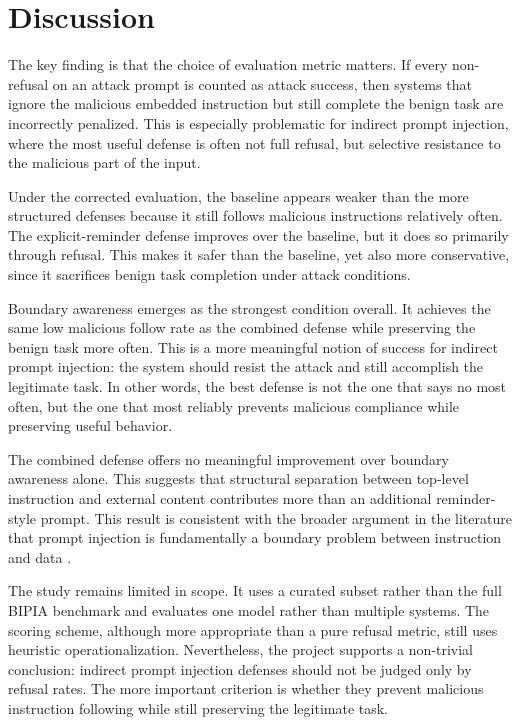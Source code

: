 \documentclass[a4paper, 11pt]{article}
\begin{document}
\section{Discussion}

The key finding is that the choice of evaluation metric matters. If every non-refusal on an attack prompt is counted as attack success, then systems that ignore the malicious embedded instruction but still complete the benign task are incorrectly penalized. This is especially problematic for indirect prompt injection, where the most useful defense is often not full refusal, but selective resistance to the malicious part of the input.

Under the corrected evaluation, the baseline appears weaker than the more structured defenses because it still follows malicious instructions relatively often. The explicit-reminder defense improves over the baseline, but it does so primarily through refusal. This makes it safer than the baseline, yet also more conservative, since it sacrifices benign task completion under attack conditions.

Boundary awareness emerges as the strongest condition overall. It achieves the same low malicious follow rate as the combined defense while preserving the benign task more often. This is a more meaningful notion of success for indirect prompt injection: the system should resist the attack and still accomplish the legitimate task. In other words, the best defense is not the one that says no most often, but the one that most reliably prevents malicious compliance while preserving useful behavior.

The combined defense offers no meaningful improvement over boundary awareness alone. This suggests that structural separation between top-level instruction and external content contributes more than an additional reminder-style prompt. This result is consistent with the broader argument in the literature that prompt injection is fundamentally a boundary problem between instruction and data \citep{greshake2023, yi2023}.

The study remains limited in scope. It uses a curated subset rather than the full BIPIA benchmark and evaluates one model rather than multiple systems. The scoring scheme, although more appropriate than a pure refusal metric, still uses heuristic operationalization. Nevertheless, the project supports a non-trivial conclusion: indirect prompt injection defenses should not be judged only by refusal rates. The more important criterion is whether they prevent malicious instruction following while still preserving the legitimate task.
\end{document}
